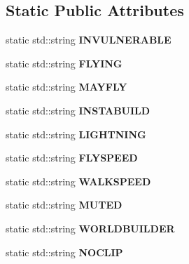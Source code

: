 \subsection*{Static Public Attributes}
\begin{DoxyCompactItemize}
\item 
\mbox{\label{struct_abilities_a82fd586d1eb534d48ebfc772d1269225}} 
static std\+::string {\bfseries I\+N\+V\+U\+L\+N\+E\+R\+A\+B\+LE}
\item 
\mbox{\label{struct_abilities_a44a63ad3c5bc5f9091da2dc11a92810d}} 
static std\+::string {\bfseries F\+L\+Y\+I\+NG}
\item 
\mbox{\label{struct_abilities_a2b0f7b1eb593a5d2d9db0d8a04d3ce40}} 
static std\+::string {\bfseries M\+A\+Y\+F\+LY}
\item 
\mbox{\label{struct_abilities_ab1508e2182f01035c543e93ac1cd9f68}} 
static std\+::string {\bfseries I\+N\+S\+T\+A\+B\+U\+I\+LD}
\item 
\mbox{\label{struct_abilities_a8b21d36a39e56b77ebe640fb7d80da0b}} 
static std\+::string {\bfseries L\+I\+G\+H\+T\+N\+I\+NG}
\item 
\mbox{\label{struct_abilities_a0242770a772fa3d2fcb796d0852d21b7}} 
static std\+::string {\bfseries F\+L\+Y\+S\+P\+E\+ED}
\item 
\mbox{\label{struct_abilities_af580dde153b2871743958e458936c8c1}} 
static std\+::string {\bfseries W\+A\+L\+K\+S\+P\+E\+ED}
\item 
\mbox{\label{struct_abilities_a0e3a075b532204e7fc0cb368da8e1d6c}} 
static std\+::string {\bfseries M\+U\+T\+ED}
\item 
\mbox{\label{struct_abilities_ac396af60dc4f93e5eb8d304af00f4edb}} 
static std\+::string {\bfseries W\+O\+R\+L\+D\+B\+U\+I\+L\+D\+ER}
\item 
\mbox{\label{struct_abilities_a16368bca2391d9a29d7247ab0014bb44}} 
static std\+::string {\bfseries N\+O\+C\+L\+IP}
\item 

\end{DoxyCompactItemize}
